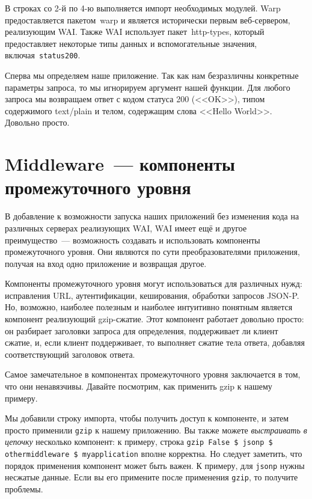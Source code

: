 
В строках со 2-й по 4-ю выполняется импорт необходимых модулей. Warp
предоставляется пакетом~warp и является исторически первым веб-сервером,
реализующим WAI. Также WAI использует пакет~http-types, который предоставляет
некоторые типы данных и вспомогательные значения,
включая~\lstinline!status200!.

Сперва мы определяем наше приложение. Так как нам безразличны конкретные
параметры запроса, то мы игнорируем аргумент нашей функции. Для любого запроса
мы возвращаем ответ с кодом статуса 200 (<<OK>>), типом содержимого text/plain
и телом, содержащим слова <<Hello World>>. Довольно просто.

\section {Middleware~--- компоненты промежуточного уровня}

В добавление к возможности запуска наших приложений без изменения кода на
различных серверах реализующих WAI, WAI имеет ещё и другое преимущество~---
возможность создавать и использовать компоненты промежуточного уровня. Они
являются по сути преобразователями приложения, получая на вход одно приложение
и возвращая другое.

Компоненты промежуточного уровня могут использоваться для различных нужд:
исправления URL, аутентификации, кеширования, обработки запросов JSON-P. Но,
возможно, наиболее полезным и наиболее интуитивно понятным является компонент
реализующий gzip-сжатие. Этот компонент работает довольно просто: он разбирает
заголовки запроса для определения, поддерживает ли клиент сжатие, и, если
клиент поддерживает, то выполняет сжатие тела ответа, добавляя соответствующий
заголовок ответа.

Самое замечательное в компонентах промежуточного уровня заключается в том, что
они ненавязчивы. Давайте посмотрим, как применить gzip к нашему примеру.


Мы добавили строку импорта, чтобы получить доступ к компоненте, и затем просто
применили \lstinline!gzip!  к нашему приложению. Вы также можете
\emph{выстраивать в цепочку} несколько компонент: к примеру, строка
\lstinline'gzip False $ jsonp $ othermiddleware $ myapplication' вполне
корректна. Но следует заметить, что порядок применения компонент может быть
важен. К примеру, для \lstinline!jsonp! нужны несжатые данные. Если вы его
примените после применения \lstinline!gzip!, то получите проблемы.
